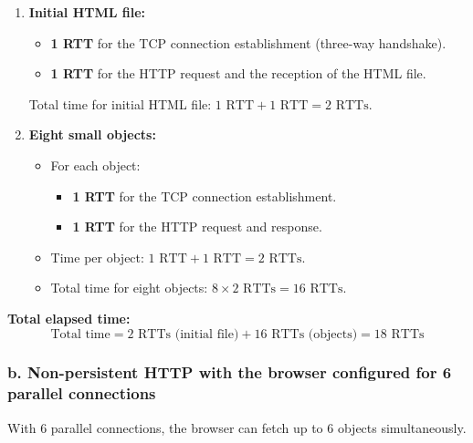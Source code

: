 \documentclass{cshwk}
\begin{document}
    \begin{enumerate}
        \item \textbf{Initial HTML file:}
        \begin{itemize}
            \item \textbf{1 RTT} for the TCP connection establishment (three-way handshake).
            \item \textbf{1 RTT} for the HTTP request and the reception of the HTML file.
        \end{itemize}
        Total time for initial HTML file: \( 1 \text{ RTT} + 1 \text{ RTT} = 2 \text{ RTTs} \).
        
        \item \textbf{Eight small objects:}
        \begin{itemize}
            \item For each object:
                \begin{itemize}
                    \item \textbf{1 RTT} for the TCP connection establishment.
                    \item \textbf{1 RTT} for the HTTP request and response.
                \end{itemize}
            \item Time per object: \( 1 \text{ RTT} + 1 \text{ RTT} = 2 \text{ RTTs} \).
            \item Total time for eight objects: \( 8 \times 2 \text{ RTTs} = 16 \text{ RTTs} \).
        \end{itemize}
    \end{enumerate}

    \noindent \textbf{Total elapsed time:}
    \[
    \text{Total time} = 2 \text{ RTTs (initial file)} + 16 \text{ RTTs (objects)} = \boxed{18 \text{ RTTs}}
    \]

    \subsubsection*{b. Non-persistent HTTP with the browser configured for 6 parallel connections}

    With 6 parallel connections, the browser can fetch up to 6 objects simultaneously.
\end{document}
